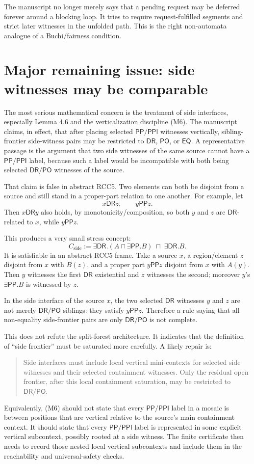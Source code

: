 \documentclass[11pt]{article}
\newcommand{\EQ}{\mathsf{EQ}}
\newcommand{\DR}{\mathsf{DR}}
\newcommand{\PO}{\mathsf{PO}}
\newcommand{\PP}{\mathsf{PP}}
\newcommand{\PPI}{\mathsf{PPI}}
\begin{document}
The manuscript no longer merely says that a pending request may be deferred forever around a blocking loop.  It tries to require request-fulfilled segments and strict later witnesses in the unfolded path.  This is the right non-automata analogue of a Buchi/fairness condition.

\section{Major remaining issue: side witnesses may be comparable}

The most serious mathematical concern is the treatment of side interfaces, especially Lemma 4.6 and the verticalization discipline (M6).  The manuscript claims, in effect, that after placing selected $\PP/\PPI$ witnesses vertically, sibling-frontier side-witness pairs may be restricted to $\DR$, $\PO$, or $\EQ$.  A representative passage is the argument that two side witnesses of the same source cannot have a $\PP/\PPI$ label, because such a label would be incompatible with both being selected $\DR/\PO$ witnesses of the source.

That claim is false in abstract RCC5.  Two elements can both be disjoint from a source and still stand in a proper-part relation to one another.  For example, let
\[
    x \DR z, \qquad y \PP z.
\]
Then $x \DR y$ also holds, by monotonicity/composition, so both $y$ and $z$ are $\DR$-related to $x$, while $y \PP z$.

This produces a very small stress concept:
\[
 C_{\mathrm{side}} :=
 \exists\DR.(A \sqcap \exists\PP.B)
 \;\sqcap\;
 \exists\DR.B.
\]
It is satisfiable in an abstract RCC5 frame.  Take a source $x$, a region/element $z$ disjoint from $x$ with $B(z)$, and a proper part $y \PP z$ disjoint from $x$ with $A(y)$.  Then $y$ witnesses the first $\DR$ existential and $z$ witnesses the second; moreover $y$'s $\exists\PP.B$ is witnessed by $z$.

In the side interface of the source $x$, the two selected $\DR$ witnesses $y$ and $z$ are not merely $\DR/\PO$ siblings: they satisfy $y\PP z$.  Therefore a rule saying that all non-equality side-frontier pairs are only $\DR/\PO$ is not complete.

This does not refute the split-forest architecture.  It indicates that the definition of ``side frontier'' must be saturated more carefully.  A likely repair is:
\begin{quote}
Side interfaces must include local vertical mini-contexts for selected side witnesses and their selected containment witnesses.  Only the residual open frontier, after this local containment saturation, may be restricted to $\DR/\PO$.
\end{quote}
Equivalently, (M6) should not state that every $\PP/\PPI$ label in a mosaic is between positions that are vertical relative to the source's main containment context.  It should state that every $\PP/\PPI$ label is represented in some explicit vertical subcontext, possibly rooted at a side witness.  The finite certificate then needs to record those nested local vertical subcontexts and include them in the reachability and universal-safety checks.
\end{document}

